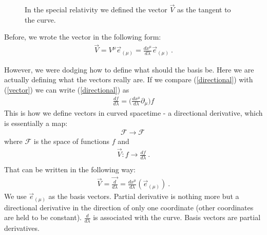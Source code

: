\documentclass[11pt]{article}
\begin{document}
    \begin{figure} [H]
        \begin{center}


        \caption{ In the special relativity we defined the vector $\vec{V}$ as the tangent to the curve. }
\end{center}
 \end{figure}

Before, we wrote the vector in the following form:
\begin{align}
\vec{V} = V^\mu \vec{e}_{(\mu)} = \frac{dx^\mu}{d\lambda} \vec{e}_{(\mu)} \ .\label{vector}
\end{align}

However, we were dodging how to define what should the basis be. Here we are actually defining what the vectors really are. If we compare (\ref{directional}) with (\ref{vector}) we can write (\ref{directional}) as
\begin{align}
 \frac{df}{d\lambda}=\Big(\frac{dx^\mu}{d\lambda} \partial_\mu \Big) f
\end{align}
This is how we define vectors in curved spacetime - a directional derivative, which is essentially a map:
\begin{align*}
\mathcal{F} \rightarrow \mathcal{F} \ 
\end{align*}
where $\mathcal{F}$ is the space of functions $f$ and
\begin{align*}
\vec{V} : f \rightarrow \frac{df}{d\lambda} \ . \\
\end{align*}
That can be written in the following way:
\begin{align}
\vec{V} = \vec{\frac{d}{d\lambda}} = \frac{dx^\mu}{d\lambda} (\vec{e}_{(\mu)})  \ .
\end{align}
We use $\vec{e}_{(\mu)}$ as the basis vectors. Partial derivative is nothing more but a directional derivative in the direction of only one coordinate (other coordinates are held to be constant). $\frac{d}{d\lambda}$ is associated with the curve. Basis vectors are partial derivatives.
\end{document}
